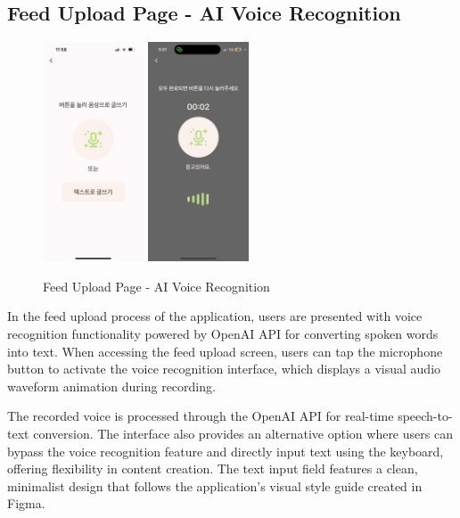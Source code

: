 \documentclass[conference]{IEEEtran}
\begin{document}
    \subsection{Feed Upload Page - AI Voice Recognition}
        \begin{figure}[htbp]
            \centerline{
            \includegraphics[width=3cm]{Images/page/recording1.jpg}
            \includegraphics[width=3cm]{Images/page/recording.png}}
              \caption{Feed Upload Page - AI Voice Recognition}
            \label{fig}
        \end{figure}
        In the feed upload process of the application, users are presented with voice recognition functionality powered by OpenAI API for converting spoken words into text. When accessing the feed upload screen, users can tap the microphone button to activate the voice recognition interface, which displays a visual audio waveform animation during recording.

        The recorded voice is processed through the OpenAI API for real-time speech-to-text conversion. The interface also provides an alternative option where users can bypass the voice recognition feature and directly input text using the keyboard, offering flexibility in content creation. The text input field features a clean, minimalist design that follows the application's visual style guide created in Figma.
\end{document}
